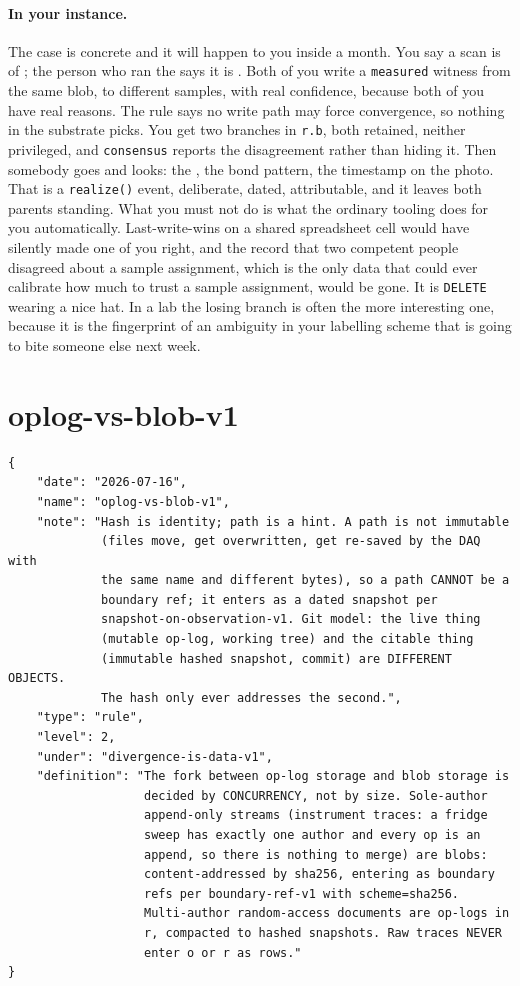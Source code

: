 \paragraph{In your instance.} The case is concrete and it will happen to you inside a month. You say a scan is of \texttt{\labSample}; the person who ran the \labInstrumentShort{} says it is \texttt{\labSampleAltShort}. Both of you write a \texttt{measured} witness from the same blob, to different samples, with real confidence, because both of you have real reasons. The rule says no write path may force convergence, so nothing in the substrate picks. You get two branches in \texttt{r.b}, both retained, neither privileged, and \texttt{consensus} reports the disagreement rather than hiding it. Then somebody goes and looks: the \labGrowthLog{}, the bond pattern, the timestamp on the \labSampleCarrier{} photo. That is a \texttt{realize()} event, deliberate, dated, attributable, and it leaves both parents standing. What you must not do is what the ordinary tooling does for you automatically. Last-write-wins on a shared spreadsheet cell would have silently made one of you right, and the record that two competent people disagreed about a sample assignment, which is the only data that could ever calibrate how much to trust a sample assignment, would be gone. It is \texttt{DELETE} wearing a nice hat. In a lab the losing branch is often the more interesting one, because it is the fingerprint of an ambiguity in your labelling scheme that is going to bite someone else next week.

\section{oplog-vs-blob-v1}

\begin{lstlisting}[language={},basicstyle=\ttfamily\footnotesize]
{
    "date": "2026-07-16",
    "name": "oplog-vs-blob-v1",
    "note": "Hash is identity; path is a hint. A path is not immutable
             (files move, get overwritten, get re-saved by the DAQ with
             the same name and different bytes), so a path CANNOT be a
             boundary ref; it enters as a dated snapshot per
             snapshot-on-observation-v1. Git model: the live thing
             (mutable op-log, working tree) and the citable thing
             (immutable hashed snapshot, commit) are DIFFERENT OBJECTS.
             The hash only ever addresses the second.",
    "type": "rule",
    "level": 2,
    "under": "divergence-is-data-v1",
    "definition": "The fork between op-log storage and blob storage is
                   decided by CONCURRENCY, not by size. Sole-author
                   append-only streams (instrument traces: a fridge
                   sweep has exactly one author and every op is an
                   append, so there is nothing to merge) are blobs:
                   content-addressed by sha256, entering as boundary
                   refs per boundary-ref-v1 with scheme=sha256.
                   Multi-author random-access documents are op-logs in
                   r, compacted to hashed snapshots. Raw traces NEVER
                   enter o or r as rows."
}
\end{lstlisting}

